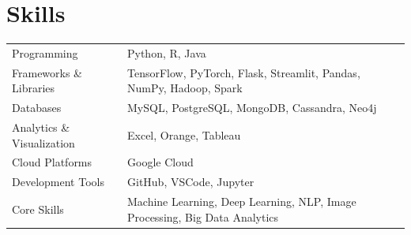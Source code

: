 \documentclass[a4paper,12pt]{article}
\begin{document}
\section{Skills}
\begin{tabularx}{\linewidth}{@{}l X@{}}
Programming & Python, R, Java \\
Frameworks \& Libraries & TensorFlow, PyTorch, Flask, Streamlit, Pandas, NumPy, Hadoop, Spark \\
Databases & MySQL, PostgreSQL, MongoDB, Cassandra, Neo4j \\
Analytics \& Visualization & Excel, Orange, Tableau \\
Cloud Platforms & Google Cloud \\
Development Tools & GitHub, VSCode, Jupyter \\
Core Skills & Machine Learning, Deep Learning, NLP, Image Processing, Big Data Analytics \\
\end{tabularx}

\vfill
\end{document}
